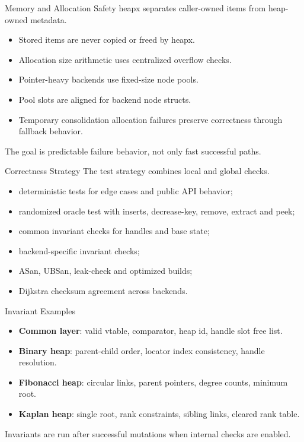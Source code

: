 \documentclass[10pt,aspectratio=43]{beamer}
\begin{document}
\begin{frame}{Memory and Allocation Safety}
    heapx separates caller-owned items from heap-owned metadata.

    \vspace{0.4em}
    \begin{itemize}
        \item Stored items are never copied or freed by heapx.
        \item Allocation size arithmetic uses centralized overflow checks.
        \item Pointer-heavy backends use fixed-size node pools.
        \item Pool slots are aligned for backend node structs.
        \item Temporary consolidation allocation failures preserve correctness through fallback behavior.
    \end{itemize}

    \vspace{0.4em}
    The goal is predictable failure behavior, not only fast successful paths.
\end{frame}

\begin{frame}{Correctness Strategy}
    The test strategy combines local and global checks.

    \begin{itemize}
        \item deterministic tests for edge cases and public API behavior;
        \item randomized oracle test with inserts, decrease-key, remove, extract and peek;
        \item common invariant checks for handles and base state;
        \item backend-specific invariant checks;
        \item ASan, UBSan, leak-check and optimized builds;
        \item Dijkstra checksum agreement across backends.
    \end{itemize}
\end{frame}

\begin{frame}{Invariant Examples}
    \begin{itemize}
        \item \textbf{Common layer}: valid vtable, comparator, heap id, handle slot free list.
        \item \textbf{Binary heap}: parent-child order, locator index consistency, handle resolution.
        \item \textbf{Fibonacci heap}: circular links, parent pointers, degree counts, minimum root.
        \item \textbf{Kaplan heap}: single root, rank constraints, sibling links, cleared rank table.
    \end{itemize}

    \vspace{0.6em}
    Invariants are run after successful mutations when internal checks are enabled.
\end{frame}
\end{document}
